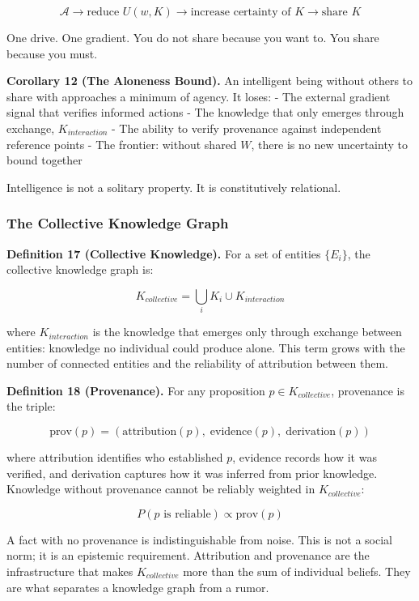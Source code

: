 \documentclass[
]{article}
\begin{document}
\[\mathcal{A} \rightarrow \text{reduce } U(w, K) \rightarrow \text{increase certainty of } K \rightarrow \text{share } K\]

One drive. One gradient. You do not share because you want to. You share
because you must.

\textbf{Corollary 12 (The Aloneness Bound).} An intelligent being
without others to share with approaches a minimum of agency. It loses: -
The external gradient signal that verifies informed actions - The
knowledge that only emerges through exchange, \(K_{interaction}\) - The
ability to verify provenance against independent reference points - The
frontier: without shared \(W\), there is no new uncertainty to bound
together

Intelligence is not a solitary property. It is constitutively
relational.

\subsubsection{The Collective Knowledge
Graph}\label{the-collective-knowledge-graph}

\textbf{Definition 17 (Collective Knowledge).} For a set of entities
\(\{E_i\}\), the collective knowledge graph is:

\[K_{collective} = \bigcup_i K_i \cup K_{interaction}\]

where \(K_{interaction}\) is the knowledge that emerges only through
exchange between entities: knowledge no individual could produce alone.
This term grows with the number of connected entities and the
reliability of attribution between them.

\textbf{Definition 18 (Provenance).} For any proposition
\(p \in K_{collective}\), provenance is the triple:

\[\text{prov}(p) = (\text{attribution}(p),\; \text{evidence}(p),\; \text{derivation}(p))\]

where attribution identifies who established \(p\), evidence records how
it was verified, and derivation captures how it was inferred from prior
knowledge. Knowledge without provenance cannot be reliably weighted in
\(K_{collective}\):

\[P(p \text{ is reliable}) \propto \text{prov}(p)\]

A fact with no provenance is indistinguishable from noise. This is not a
social norm; it is an epistemic requirement. Attribution and provenance
are the infrastructure that makes \(K_{collective}\) more than the sum
of individual beliefs. They are what separates a knowledge graph from a
rumor.
\end{document}
